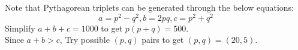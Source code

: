 \documentclass[12pt]{article}
\begin{document}
Note that Pythagorean triplets can be generated through the below equations:
$$a = p^2 - q^2, b = 2pq, c = p^2 + q^2$$
Simplify $a + b + c = 1000$ to get $p(p+q) = 500$.\\
Since $a+b>c$, Try possible $(p,q)$ pairs to get $(p,q)=(20,5)$.
\end{document}
